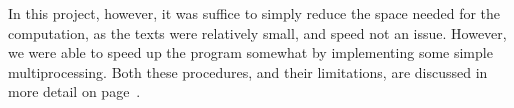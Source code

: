 In this project, however, it was suffice to simply reduce the space
needed for the computation, as the texts were relatively small, and
speed not an issue. However, we were able to speed up the program
somewhat by implementing some simple multiprocessing. Both these
procedures, and their limitations, are discussed in more detail on
page~\pageref{multiprocessing-bit}.





